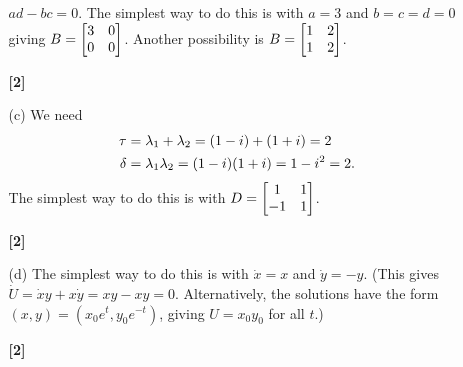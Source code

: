 \documentclass[a4paper]{article}
\newcounter{probcounter}
\newcounter{marksawarded}
\newcommand{\mks}[1]{%
\addtocounter{marksawarded}{#1}%
\textbf{\color{red}[#1]}}
\newenvironment{solution}{\comment}{\endcomment}
\newenvironment{solution}{
{\bigskip\par\noindent \bf Solution:}}{
\newpage
\typeout{Q\arabic{probcounter}: \arabic{marksawarded} marks awarded}
}
\begin{document}
\begin{solution}
\begin{itemize}
\begin{itemize}
     $ad-bc=0$.  The simplest way to do this is with $a=3$ and
     $b=c=d=0$ giving $B=\left[\begin{matrix} 3&0\\ 0&0\end{matrix}\right]$.  Another possibility is
     $B=\left[\begin{matrix} 1&2\\1&2\end{matrix}\right]$.  \mks{2}
    \item[(c)] We need
     \begin{align*}
      \tau &= \lambda_1+\lambda_2 = (1-i) + (1+i) = 2 \\
      \delta &= \lambda_1\lambda_2 = (1-i)(1+i) = 1 - i^2 = 2.
     \end{align*}
     The simplest way to do this is with $D=\left[\begin{matrix} 1&1\\-1&1\end{matrix}\right]$.  \mks{2}
    \item[(d)] The simplest way to do this is with $\dot{x}=x$ and
     $\dot{y}=-y$.  (This gives $\dot{U}=\dot{x}y+x\dot{y}=xy-xy=0$.
     Alternatively, the solutions have the form
     $(x,y)=(x_0e^t,y_0e^{-t})$, giving $U=x_0y_0$ for all $t$.)
     \mks{2}
  \end{itemize}
 \end{itemize}
\end{solution}
\end{document}
